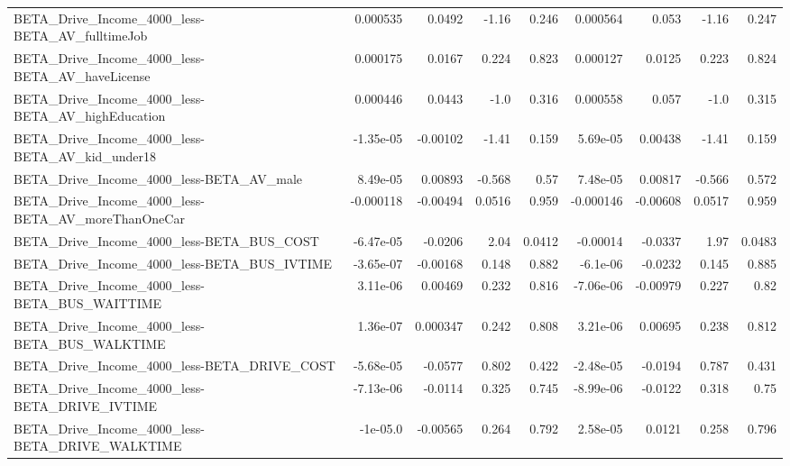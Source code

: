 \begin{tabular}{lrrrrrrrr}
BETA\_Drive\_Income\_4000\_less-BETA\_AV\_fulltimeJob    &    0.000535 &       0.0492 &    -1.16 &    0.246 &   0.000564 &       0.053 &        -1.16 &         0.247 \\
BETA\_Drive\_Income\_4000\_less-BETA\_AV\_haveLicense    &    0.000175 &       0.0167 &    0.224 &    0.823 &   0.000127 &      0.0125 &        0.223 &         0.824 \\
BETA\_Drive\_Income\_4000\_less-BETA\_AV\_highEducation  &    0.000446 &       0.0443 &     -1.0 &    0.316 &   0.000558 &       0.057 &         -1.0 &         0.315 \\
BETA\_Drive\_Income\_4000\_less-BETA\_AV\_kid\_under18    &   -1.35e-05 &     -0.00102 &    -1.41 &    0.159 &   5.69e-05 &     0.00438 &        -1.41 &         0.159 \\
BETA\_Drive\_Income\_4000\_less-BETA\_AV\_male           &    8.49e-05 &      0.00893 &   -0.568 &     0.57 &   7.48e-05 &     0.00817 &       -0.566 &         0.572 \\
BETA\_Drive\_Income\_4000\_less-BETA\_AV\_moreThanOneCar &   -0.000118 &     -0.00494 &   0.0516 &    0.959 &  -0.000146 &    -0.00608 &       0.0517 &         0.959 \\
BETA\_Drive\_Income\_4000\_less-BETA\_BUS\_COST          &   -6.47e-05 &      -0.0206 &     2.04 &   0.0412 &   -0.00014 &     -0.0337 &         1.97 &        0.0483 \\
BETA\_Drive\_Income\_4000\_less-BETA\_BUS\_IVTIME        &   -3.65e-07 &     -0.00168 &    0.148 &    0.882 &   -6.1e-06 &     -0.0232 &        0.145 &         0.885 \\
BETA\_Drive\_Income\_4000\_less-BETA\_BUS\_WAITTIME      &    3.11e-06 &      0.00469 &    0.232 &    0.816 &  -7.06e-06 &    -0.00979 &        0.227 &          0.82 \\
BETA\_Drive\_Income\_4000\_less-BETA\_BUS\_WALKTIME      &    1.36e-07 &     0.000347 &    0.242 &    0.808 &   3.21e-06 &     0.00695 &        0.238 &         0.812 \\
BETA\_Drive\_Income\_4000\_less-BETA\_DRIVE\_COST        &   -5.68e-05 &      -0.0577 &    0.802 &    0.422 &  -2.48e-05 &     -0.0194 &        0.787 &         0.431 \\
BETA\_Drive\_Income\_4000\_less-BETA\_DRIVE\_IVTIME      &   -7.13e-06 &      -0.0114 &    0.325 &    0.745 &  -8.99e-06 &     -0.0122 &        0.318 &          0.75 \\
BETA\_Drive\_Income\_4000\_less-BETA\_DRIVE\_WALKTIME    &    -1e-05.0 &     -0.00565 &    0.264 &    0.792 &   2.58e-05 &      0.0121 &        0.258 &         0.796 \\

\end{tabular}
